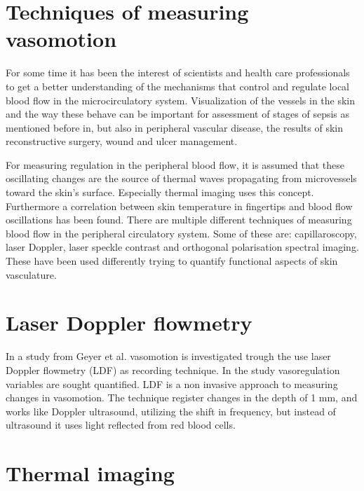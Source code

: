 \section{Techniques of measuring vasomotion}

For some time it has been the interest of scientists and health care professionals to get a better understanding of the mechanisms 
that control and regulate local blood flow in the microcirculatory system\cite{sagaidachnyi2014,sagaidachnyi2017,Geyer2004,liu2012}. 
Visualization of the vessels in the skin and the way these behave can be important for assessment of stages of sepsis as mentioned before in, but also in peripheral vascular disease, the results of skin reconstructive surgery, wound and ulcer management.\cite{liu2012,kanta2014}

For measuring regulation in the peripheral blood flow, it is assumed that these oscillating changes are the source of thermal waves
propagating from microvessels toward the skin’s surface. Especially thermal imaging uses this concept.\cite{sagaidachnyi2017}
Furthermore a correlation between skin temperature in fingertips and blood flow oscillations has been found\cite{sagaidachnyi2014}.
There are multiple different techniques of measuring blood flow in the peripheral circulatory system. Some of these are: capillaroscopy, laser Doppler, laser speckle contrast and orthogonal polarisation spectral imaging. These have been used differently trying to quantify functional aspects of skin vasculature.\cite{liu2012}



\section{Laser Doppler flowmetry}

In a study from Geyer et al. vasomotion is investigated trough the use laser Doppler flowmetry (LDF) as recording technique. In the study vasoregulation variables are sought quantified. LDF is a non invasive approach to measuring changes in vasomotion. The technique register changes in the depth of 1 mm, and works like Doppler ultrasound, utilizing the shift in frequency, but instead of ultrasound it uses light reflected from red blood cells.\cite{Geyer2004} 




\section{Thermal imaging}

